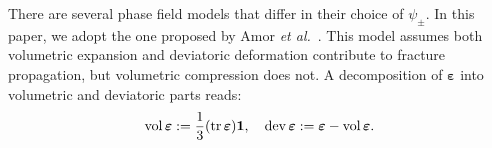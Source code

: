 
There are several phase field models that differ in their choice of $\psi_{\pm}$. In this paper, we {adopt} the one proposed by Amor \emph{et al.}~\cite{Amor09}.
This model %
assumes both volumetric expansion and deviatoric deformation contribute to fracture propagation, but volumetric compression does not. A decomposition of $\bm{\varepsilon}$ into volumetric and deviatoric parts reads:
\begin{equation*}
    \begin{aligned}
        \operatorname{vol}\bm{\varepsilon} := \frac{1}{3} (\operatorname{tr}\bm{\varepsilon}) \mathbf{1}, \quad
        \operatorname{dev}\bm{\varepsilon} := \bm{\varepsilon} - \operatorname{vol}\bm{\varepsilon}.
    \end{aligned}
\end{equation*}


